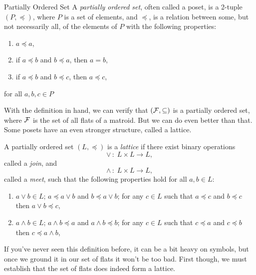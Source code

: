 \documentclass[12pt,oneside]{../../sfsuthesis}
\begin{document}
\begin{definition}{Partially Ordered Set}\th\label{def:poset}
    A \emph{partially ordered set}, often called a poset, is a 2-tuple \( (P, \preceq) \), where \( P \) is a set of elements, and \( \preceq \), is a relation between some, but not necessarily all, of the elements of \( P \) with the following properties:
    \begin{enumerate}[label=\roman*.]
        \item\(a \preceq a\),
        \item if \( a \preceq b \) and \( b \preceq a \), then \( a = b \),
        \item if \( a \preceq b \) and \( b \preceq c \), then \( a \preceq c \),
    \end{enumerate}
    for all \( a, b, c \in P \)
\end{definition}

With the definition in hand, we can verify that \( (\mathcal{F}, \subseteq) \) is a partially ordered set, where \( \mathcal{F} \) is the set of all flats of a matroid.
But we can do even better than that.
Some posets have an even stronger structure, called a lattice.

\begin{definition}[Lattice]\th\label{def:lattice}
    A partially ordered set \( (L, \preceq) \) is a \emph{lattice} if there exist binary operations
    \[
        \vee \, : \; L \times L \to L,
    \]
    called a \emph{join}, and
    \[
        \wedge \, : \; L \times L \to L,
    \]
    called a \emph{meet}, such that the following properties hold for all \( a, b \in L \):
    \begin{enumerate}[label=\roman*.]
        \item \(a \vee b \in L\); \( a \preceq a \vee b \) and \( b \preceq a \vee b \); for any \( c \in L \) such that \( a \preceq c \) and \( b \preceq c \) then \( a \vee b \preceq c \),
        \item \(a \wedge b \in L\); \( a \wedge b \preceq a \) and \( a \wedge b \preceq b \); for any \( c \in L \) such that \( c \preceq a \) and \( c \preceq b \) then \( c \preceq a \wedge b \),
    \end{enumerate}

\end{definition}

If you've never seen this definition before, it can be a bit heavy on symbols, but once we ground it in our set of flats it won't be too bad.
First though, we must establish that the set of flats does indeed form a lattice.
\end{document}
